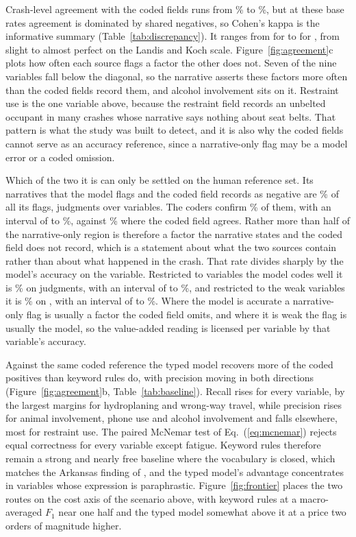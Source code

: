 Crash-level agreement with the coded fields runs from \Agreemin\% to \Agreemax\%, but at these
base rates agreement is dominated by shared negatives, so Cohen's kappa is the informative
summary (Table~\ref{tab:discrepancy}). It ranges from \Kappamin{} for \KappaminVar{} to
\Kappamax{} for \KappamaxVar{}, from slight to almost perfect on the Landis and Koch scale.
Figure~\ref{fig:agreement}c plots how often each source flags a factor the other does not. Seven
of the nine variables fall below the diagonal, so the narrative asserts these factors more often
than the coded fields record them, and alcohol involvement sits on it. Restraint use is the one
variable above, because the restraint field records an unbelted occupant in many crashes whose
narrative says nothing about seat belts. That pattern is what the study was built to detect, and
it is also why the coded fields cannot serve as an accuracy reference, since a narrative-only
flag may be a model error or a coded omission.

Which of the two it is can only be settled on the human reference set. Its narratives that the
model flags and the coded field records as negative are \NarrOnlyShare\% of all its flags,
\NarrOnlyN{} judgments over \NarrOnlyNVars{} variables. The coders confirm \NarrOnly\% of them,
with an interval of \NarrOnlyLo{} to \NarrOnlyHi\%, against \CodedConf\% where the coded field
agrees. Rather more than half of the narrative-only region is therefore a factor the narrative
states and the coded field does not record, which is a statement about what the two sources
contain rather than about what happened in the crash. That rate divides sharply by the model's
accuracy on the variable. Restricted to variables the model codes well it is \NarrOnlyStrong\%
on \NarrOnlyStrongN{} judgments, with an interval of \NarrOnlyStrongLo{} to
\NarrOnlyStrongHi\%, and restricted to the weak variables it is \NarrOnlyWeak\% on
\NarrOnlyWeakN{}, with an interval of \NarrOnlyWeakLo{} to \NarrOnlyWeakHi\%. Where the model is accurate a narrative-only flag is usually a factor the
coded field omits, and where it is weak the flag is usually the model, so the value-added
reading is licensed per variable by that variable's accuracy.

Against the same coded reference the typed model recovers more of the coded positives than
keyword rules do, with precision moving in both directions (Figure~\ref{fig:agreement}b,
Table~\ref{tab:baseline}). Recall rises for every variable, by the largest margins for
hydroplaning and wrong-way travel, while precision rises for animal involvement, phone use and
alcohol involvement and falls elsewhere, most for restraint use. The paired McNemar test of
Eq.~(\ref{eq:mcnemar}) rejects equal correctness for every variable except fatigue. Keyword
rules therefore remain a strong and nearly free baseline where the vocabulary is closed, which
matches the Arkansas finding of \citet{bharati2026benchmarking}, and the typed model's advantage
concentrates in variables whose expression is paraphrastic. Figure~\ref{fig:frontier} places the
two routes on the cost axis of the scenario above, with keyword rules at a macro-averaged $F_1$
near one half and the typed model somewhat above it at a price two orders of magnitude
higher.

